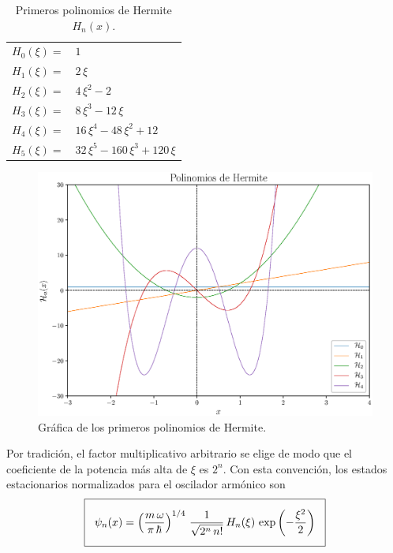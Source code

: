 \begin{center}
\begin{table}[H]
\centering
\begin{tabular}{l l}
$H_{0}(\xi) =$ & $1$ \\
$H_{1}(\xi) =$ & $2 \, \xi$ \\
$H_{2}(\xi) =$ & $4 \, \xi^{2} - 2 $ \\
$H_{3}(\xi) =$ & $8 \, \xi^{3} - 12 \, \xi$ \\
$H_{4}(\xi) =$ & $16 \, \xi^{4} - 48 \, \xi^{2} + 12 $ \\
$H_{5}(\xi) =$ & $32 \, \xi^{5} - 160 \, \xi^{3} + 120 \, \xi$
\end{tabular}
\caption{Primeros polinomios de Hermite $H_{n}(x)$.}
\label{tabla_001}
\end{table}
\begin{figure}[H]
    \centering
    \includegraphics[scale=0.7]{Imagenes/Polinomios_Hermite_01.eps}
    \caption{Gráfica de los primeros polinomios de Hermite.}
    \label{figura_003}
\end{figure}
\end{center}
Por tradición, el factor multiplicativo arbitrario se elige de modo que el coeficiente de la potencia más alta de $\xi$ es $2^{n}$. Con esta convención, los estados estacionarios normalizados para el oscilador armónico son
\begin{align}
\setlength{\fboxsep}{3\fboxsep}\boxed{
\psi_{n} (x) = \left( \dfrac{m \, \omega}{\pi \, \hbar} \right)^{1/4} \, \dfrac{1}{\sqrt{2^{n} \, n!}} \, H_{n} (\xi) \, \exp \left( - \dfrac{\xi^{2}}{2} \right)}
\label{eq:ecuacion_02_069}
\end{align}
